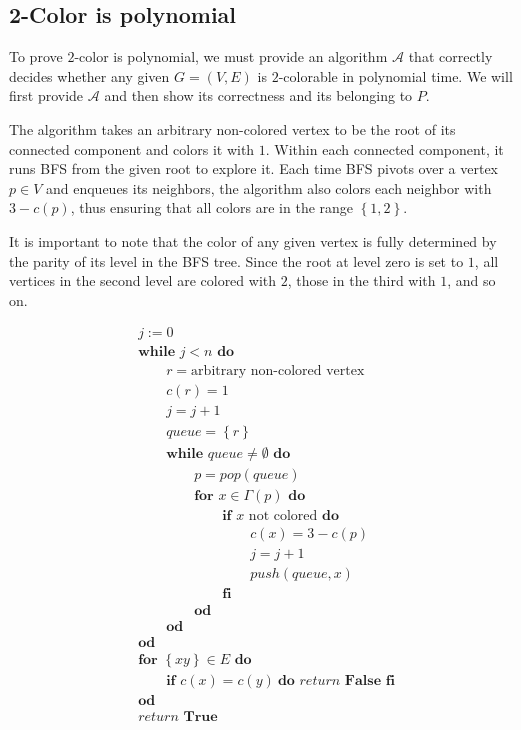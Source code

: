 \documentclass[a4paper]{article}
\begin{document}
\subsection{2-Color is polynomial}

To prove $2$-color is polynomial, we must provide an algorithm $\mathcal{A}$
that correctly decides whether any given $G = (V, E)$ is $2$-colorable in
polynomial time. We will first provide $\mathcal{A}$ and then show its
correctness and its belonging to $P$.

The algorithm takes an arbitrary non-colored vertex to be the root of its
connected component and colors it with $1$. Within each connected component, it
runs BFS from the given root to explore it. Each time BFS
pivots over a vertex $p \in V$ and enqueues its neighbors, the algorithm also
colors each neighbor with $3 - c(p)$, thus ensuring that all colors are in the
range $\left\{ 1, 2 \right\} $.

It is important to note that the color of any given vertex is fully determined
by the parity of its level in the BFS tree. Since the root at level zero is set
to $1$, all vertices in the second level are colored with $2$, those in the
third with $1$, and so on.

\begin{align*}
    &j := 0\\
    &\textbf{while } j < n \textbf{ do } \\
    &\qquad r = \text{arbitrary non-colored vertex} \\ 
    &\qquad c(r) = 1 \\ 
    &\qquad j = j + 1 \\ 
    &\qquad queue = \left\{ r \right\} \\ 
    & \qquad\textbf{while } queue \neq \emptyset \textbf{ do } \\ 
    & \qquad \qquad p = pop(queue) \\ 
    &\qquad\qquad \textbf{for } x \in \Gamma(p) \textbf{ do } \\ 
    & \qquad \qquad \qquad \textbf{if } x \text{ not colored} \textbf{ do} \\ 
    &\qquad \qquad \qquad \qquad c(x) = 3 - c(p)\\ 
    &\qquad \qquad \qquad \qquad j = j + 1\\ 
    &\qquad \qquad \qquad \qquad push(queue, x)\\
    &\qquad\qquad\qquad\textbf{fi}\\
    &\qquad\qquad \textbf{od}\\ 
    &\qquad\textbf{od}\\
    &\textbf{od}\\
    &\textbf{for } \left\{ x y \right\}  \in E \textbf{ do } \\ 
    &\qquad \textbf{if } c(x) = c(y) ~  \textbf{do } return \textbf{ False fi} \\ 
    &\textbf{od}\\
    &return \textbf{ True}
\end{align*}
\end{document}
